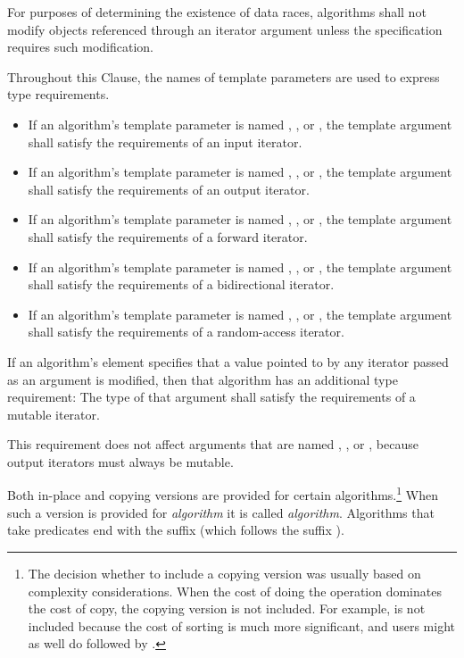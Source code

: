 \pnum
For purposes of determining the existence of data races, algorithms shall
not modify objects referenced through an iterator argument unless the
specification requires such modification.

\pnum
Throughout this Clause, the names of template parameters
are used to express type requirements.
\begin{itemize}
\item
If an algorithm's template parameter is named
,
,
or
,
the template argument shall satisfy the
requirements of an input iterator.
\item
If an algorithm's template parameter is named
,
,
or
,
the template argument shall satisfy the requirements
of an output iterator.
\item
If an algorithm's template parameter is named
,
,
or
,
the template argument shall satisfy the requirements
of a forward iterator.
\item
If an algorithm's template parameter is named
,
,
or
,
the template argument shall satisfy the requirements
of a bidirectional iterator.
\item
If an algorithm's template parameter is named
,
,
or
,
the template argument shall satisfy the requirements
of a random-access iterator.
\end{itemize}

\pnum
If an algorithm's
\effects
element specifies that a value pointed to by any iterator passed
as an argument is modified, then that algorithm has an additional
type requirement:
The type of that argument shall satisfy the requirements
of a mutable iterator.
\begin{note}
This requirement does not affect arguments that are named
,
,
or
,
because output iterators must always be mutable.
\end{note}

\pnum
Both in-place and copying versions are provided for certain
algorithms.\footnote{The decision whether to include a copying version was
usually based on complexity considerations. When the cost of doing the operation
dominates the cost of copy, the copying version is not included. For example,
 is not included because the cost of sorting is much more
significant, and users might as well do  followed by .}
When such a version is provided for \textit{algorithm} it is called
\textit{algorithm}. Algorithms that take predicates end with the
suffix  (which follows the suffix ).

